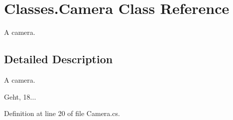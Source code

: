 \section{Classes.\-Camera Class Reference}
\label{class_classes_1_1_camera}


A camera.  




\subsection{Detailed Description}
A camera. 

Geht, 18... 

Definition at line 20 of file Camera.\-cs.

